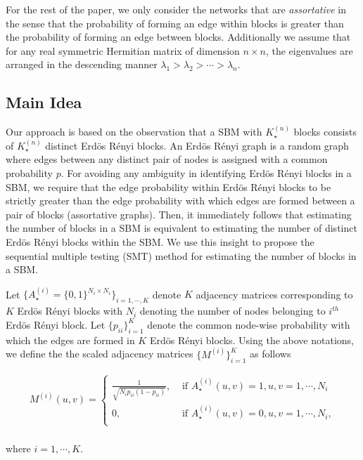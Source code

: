 \documentclass[11pt]{article}
\newcommand{\be}{\begin{eqnarray}}
\newcommand{\ee}{\end{eqnarray}}
\begin{document}
For the rest of the paper, we only consider the networks that are \emph{assortative} in the sense that the probability of forming an edge within blocks is greater than the probability of forming an edge between blocks. Additionally we assume that for any real symmetric Hermitian matrix of dimension $n \times n$, the eigenvalues are arranged in the descending manner $\lambda_1 > \lambda_2 > \cdots > \lambda_n$.

\subsection{Main Idea} Our approach is based on the observation that a SBM with $K_{\star}^{(n)}$ blocks consists of $K_{\star}^{(n)}$ distinct Erd\"{o}s R\'{e}nyi blocks. An Erd\"{o}s R\'{e}nyi graph is a random graph where edges between any distinct pair of nodes is assigned with a common probability $p$. For avoiding any ambiguity in identifying Erd\"{o}s R\'{e}nyi blocks in a SBM, we require that the edge probability within Erd\"{o}s R\'{e}nyi blocks to be strictly greater than the edge probability with which edges are formed between a pair of blocks (assortative graphs). Then, it immediately follows that estimating the number of blocks in a SBM is equivalent to estimating the number of distinct Erd\"{o}s R\'{e}nyi blocks within the SBM. We use this insight to propose the sequential multiple testing (SMT) method for estimating the number of blocks in a SBM.

Let $\{ A_{\star}^{(i)} = \{0, 1\}^{N_i \times N_i} \}_{i=1,\cdots,K}$ denote $K$ adjacency matrices corresponding to $K$ Erd\"{o}s R\'{e}nyi blocks with $N_i$ denoting the number of nodes belonging to $i^{th} $ Erd\"{o}s R\'{e}nyi block. Let $\{ p_{ii}\}_{i=1}^K$ denote the common node-wise probability with which the edges are formed in $K$ Erd\"{o}s R\'{e}nyi blocks. Using the above notations, we define the the scaled adjacency matrices $\{ M^{(i)}\}_{i=1}^K$ as follows

\be\label{scale.M}
M^{(i)}(u,v) = \begin{cases}
\frac{1}{\sqrt{N_i p_{ii} (1 - p_{ii})}} , & \text{ if } A^{(i)}_{\star}(u,v)=1, u,v =1, \cdots, N_i \\
0 , & \text{ if } A^{(i)}_{\star}(u,v) = 0, u, v =1 , \cdots, N_i,\\
\end{cases}
\ee\\

where 
$i=1, \cdots, K$.
\end{document}
